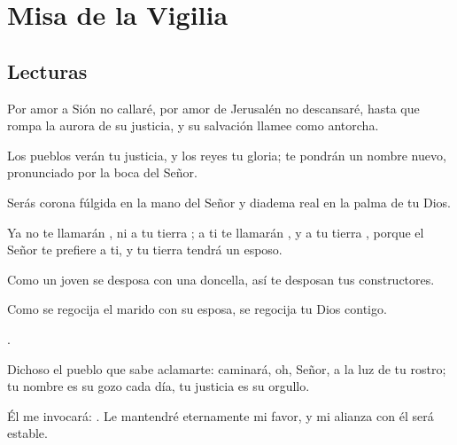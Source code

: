 \chapter{Misa de la Vigilia}

\section{Lecturas}


 


\begin{readprose}
	Por amor a Sión no callaré,	
	por amor de Jerusalén no descansaré,	
	hasta que rompa la aurora de su justicia,	
	y su salvación llamee como antorcha.
	
	Los pueblos verán tu justicia,	
	y los reyes tu gloria;	
	te pondrán un nombre nuevo,	
	pronunciado por la boca del Señor.
	
	Serás corona fúlgida en la mano del Señor
	y diadema real en la palma de tu Dios.
	
	Ya no te llamarán ,
	ni a tu tierra ;
	a ti te llamarán ,
	y a tu tierra ,
	porque el Señor te prefiere a ti,	
	y tu tierra tendrá un esposo.
	
	Como un joven se desposa con una doncella,	
	así te desposan tus constructores.
	
	Como se regocija el marido con su esposa, 
	se regocija tu Dios contigo.
\end{readprose}



 


\begin{psbody}
	. 
	
	Dichoso el pueblo que sabe aclamarte:
	caminará, oh, Señor, a la luz de tu rostro;
	tu nombre es su gozo cada día,
	tu justicia es su orgullo.
	
	Él me invocará: .
	Le mantendré eternamente mi favor,
	y mi alianza con él será estable.
\end{psbody}


